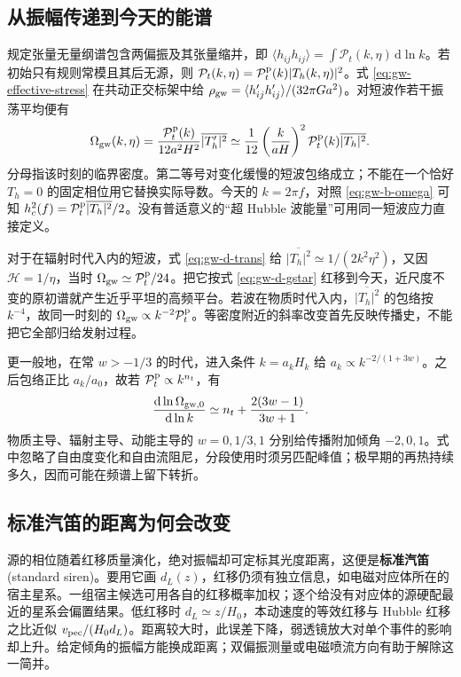 \subsection{从振幅传递到今天的能谱}

规定张量无量纲谱包含两偏振及其张量缩并，即 $\langle h_{ij}h_{ij}\rangle=\int\mathcal P_t(k,\eta)\,\mathrm d\ln k$。若初始只有规则常模且其后无源，则 $\mathcal P_t(k,\eta)=\mathcal P_t^{\rm p}(k)|T_h(k,\eta)|^2$。式 \eqref{eq:gw-effective-stress} 在共动正交标架中给 $\rho_{\rm gw}=\langle h_{ij}'h_{ij}'\rangle/(32\pi G a^2)$。对短波作若干振荡平均便有
\begin{equation}\label{eq:gw-d-omegat}
 \Omega_{\rm gw}(k,\eta)
 =\frac{\mathcal P_t^{\rm p}(k)}{12a^2H^2}\overline{|T_h'|^2}
 \simeq \frac1{12}\left(\frac{k}{aH}\right)^2
       \mathcal P_t^{\rm p}(k)\overline{|T_h|^2}.
\end{equation}
分母指该时刻的临界密度。第二等号对变化缓慢的短波包络成立；不能在一个恰好 $T_h=0$ 的固定相位用它替换实际导数。今天的 $k=2\pi f$，对照 \eqref{eq:gw-b-omega} 可知 $h_c^2(f)=\mathcal P_t^{\rm p}\overline{|T_h|^2}/2$。没有普适意义的“超 Hubble 波能量”可用同一短波应力直接定义。

对于在辐射时代入内的短波，式 \eqref{eq:gw-d-trans} 给 $\overline{|T_h|^2}\simeq1/(2k^2\eta^2)$，又因 $\mathcal H=1/\eta$，当时 $\Omega_{\rm gw}\simeq\mathcal P_t^{\rm p}/24$。把它按式 \eqref{eq:gw-d-gstar} 红移到今天，近尺度不变的原初谱就产生近乎平坦的高频平台。若波在物质时代入内，$\overline{|T_h|^2}$ 的包络按 $k^{-4}$，故同一时刻的 $\Omega_{\rm gw}\propto k^{-2}\mathcal P_t^{\rm p}$。等密度附近的斜率改变首先反映传播史，不能把它全部归给发射过程。

更一般地，在常 $w>-1/3$ 的时代，进入条件 $k=a_kH_k$ 给 $a_k\propto k^{-2/(1+3w)}$。之后包络正比 $a_k/a_0$，故若 $\mathcal P_t^{\rm p}\propto k^{n_t}$，有
\[
 \frac{\mathrm d\ln\Omega_{{\rm gw},0}}{\mathrm d\ln k}
 \simeq n_t+\frac{2(3w-1)}{3w+1}.
\]
物质主导、辐射主导、动能主导的 $w=0,1/3,1$ 分别给传播附加倾角 $-2,0,1$。式中忽略了自由度变化和自由流阻尼，分段使用时须另匹配峰值；极早期的再热持续多久，因而可能在频谱上留下转折。

\subsection{标准汽笛的距离为何会改变}

源的相位随着红移质量演化，绝对振幅却可定标其光度距离，这便是\textbf{标准汽笛}(standard siren)。要用它画 $d_L(z)$，红移仍须有独立信息，如电磁对应体所在的宿主星系。一组宿主候选可用各自的红移概率加权；逐个给没有对应体的源硬配最近的星系会偏置结果。低红移时 $d_L\simeq z/H_0$，本动速度的等效红移与 Hubble 红移之比近似 $v_{\rm pec}/(H_0d_L)$。距离较大时，此误差下降，弱透镜放大对单个事件的影响却上升。给定倾角的振幅方能换成距离；双偏振测量或电磁喷流方向有助于解除这一简并。

